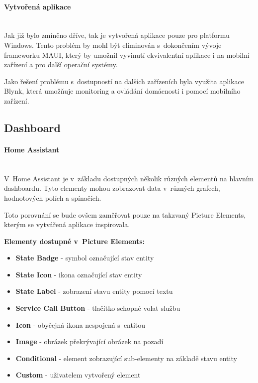 \paragraph*{Vytvořená aplikace}\mbox{} \\
Jak již bylo zmíněno dříve, tak je vytvořená aplikace pouze pro platformu Windows. Tento problém by mohl být eliminován s~dokončením vývoje frameworku MAUI, který by umožnil vyvinutí ekvivalentní aplikace i na mobilní zařízení a pro další operační systémy.

Jako řešení problému s~dostupností na dalších zařízeních byla využita aplikace Blynk, která umožňuje monitoring a ovládání domácnosti i pomocí mobilního zařízení.

\subsection*{Dashboard}
\paragraph*{Home Assistant}\mbox{} \\
V~Home Assistant je v~základu dostupných několik různých elementů na hlavním dashboardu. Tyto elementy mohou zobrazovat data v~různých grafech, hodnotových polích a spínačích. 

Toto porovnání se bude ovšem zaměřovat pouze na takzvaný Picture Elements, kterým se vytvářená aplikace inspirovala.

\noindent\textbf{Elementy dostupné v~Picture Elements:\cite{home-assistant-pictures-element}}
\begin{itemize}
  \item \textbf{State Badge} - symbol označující stav entity
  \item \textbf{State Icon} - ikona označující stav entity
  \item \textbf{State Label} - zobrazení stavu entity pomocí textu
  \item \textbf{Service Call Button} - tlačítko schopné volat službu
  \item \textbf{Icon} - obyčejná ikona nespojená s~entitou
  \item \textbf{Image} - obrázek překrývající obrázek na pozadí
  \item \textbf{Conditional} - element zobrazující sub-elementy na základě stavu entity 
  \item \textbf{Custom} - uživatelem vytvořený element
  \end{itemize}

